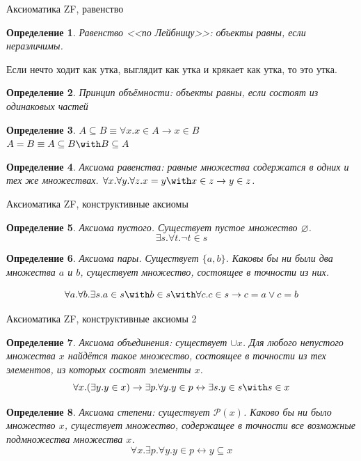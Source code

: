 \documentclass[aspectratio=169]{beamer}
\newtheorem{dfn}{Определение}[section]
\begin{document}
\begin{frame}{Аксиоматика ZF, равенство}
\begin{dfn} Равенство <<по Лейбницу>>: объекты равны, если неразличимы.\end{dfn} Если нечто ходит как утка, выглядит как 
утка и крякает как утка, то это утка.\pause
\begin{dfn} Принцип объёмности: объекты равны, если состоят из одинаковых частей\end{dfn}\pause

\begin{dfn} $A \subseteq B \equiv \forall x.x \in A \rightarrow x \in B$ \\\pause
 $A = B \equiv A \subseteq B \with B \subseteq A$ \end{dfn}\pause
\begin{dfn} Аксиома равенства: равные множества содержатся в одних и тех же множествах. 
$\forall x. \forall y. \forall z. x = y \with x \in z \rightarrow y \in z$.
\end{dfn}
\end{frame}

\begin{frame}{Аксиоматика ZF, конструктивные аксиомы}
\begin{dfn} Аксиома пустого. Существует пустое множество $\varnothing$. $$\exists s.\forall t.\neg t \in s$$ \end{dfn}\pause
\begin{dfn} Аксиома пары. Существует $\{a,b\}$.
Каковы бы ни были два множества $a$ и $b$, существует множество, состоящее 
в точности из них. 

$$\forall a.\forall b.\exists s.a \in s \with b \in s \with \forall c.c \in s \rightarrow c = a \vee c = b$$ \end{dfn}
\end{frame}

\begin{frame}{Аксиоматика ZF, конструктивные аксиомы 2}
\begin{dfn} Аксиома объединения: существует $\cup x$. 
Для любого непустого множества $x$ найдётся такое множество, состоящее в точности
из тех элементов, из которых состоят элементы $x$. 
$$\forall x.(\exists y.y \in x) \rightarrow \exists p.\forall y.y \in p \leftrightarrow \exists s.y \in s \with s \in x$$
 \end{dfn}\pause
\begin{dfn} Аксиома степени: существует $\mathcal{P}(x)$.
Каково бы ни было множество $x$, существует множество, содержащее в точности
все возможные подмножества множества $x$.
$$\forall x.\exists p.\forall y.y \in p \leftrightarrow y \subseteq x$$
\end{dfn}
\end{frame}
\end{document}
